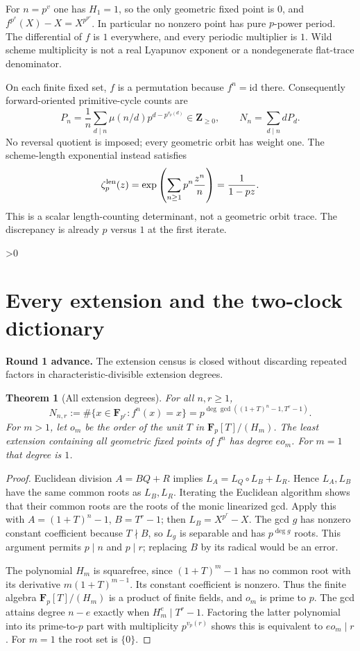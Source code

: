 \documentclass[10pt]{article}
\newtheorem{theorem}{Theorem}
\newcommand{\F}{\mathbf F}
\newcommand{\Z}{\mathbf Z}
\newcommand{\id}{\mathrm{id}}
\begin{document}
For $n=p^v$ one has $H_1=1$, so the only geometric fixed point is $0$,
and $f^{p^v}(X)-X=X^{p^{p^v}}$. In particular no nonzero point has pure
$p$-power period. The differential of $f$ is $1$ everywhere, and every
periodic multiplier is $1$. Wild scheme multiplicity is not a real
Lyapunov exponent or a nondegenerate flat-trace denominator.

On each finite fixed set, $f$ is a permutation because $f^n=\id$ there.
Consequently forward-oriented primitive-cycle counts are
\begin{equation}
 P_n=\frac1n\sum_{d\mid n}\mu(n/d)p^{d-p^{v_p(d)}}\in\Z_{\ge0},
 \qquad N_n=\sum_{d\mid n}dP_d.\label{eq:primitive}
\end{equation}
No reversal quotient is imposed; every geometric orbit has weight one.
The scheme-length exponential instead satisfies
\begin{equation}
 \zeta_p^{\rm len}(z)=\exp\left(\sum_{n\ge1}p^n\frac{z^n}{n}\right)
 =\frac1{1-pz}.\label{eq:length}
\end{equation}
This is a scalar length-counting determinant, not a geometric orbit trace.
The discrepancy is already $p$ versus $1$ at the first iterate.

\ifnum\CRevisionRound>0
\section{Every extension and the two-clock dictionary}
\noindent\textbf{Round 1 advance.} The extension census is closed without
discarding repeated factors in characteristic-divisible extension degrees.

\begin{theorem}[All extension degrees]
For all $n,r\ge1$,
\[
 N_{n,r}:=\#\{x\in\F_{p^r}:f^n(x)=x\}
 =p^{\deg\gcd((1+T)^n-1,T^r-1)}.
\]
For $m>1$, let $o_m$ be the order of the unit $T$ in
$\F_p[T]/(H_m)$. The least extension containing all geometric fixed
points of $f^n$ has degree $eo_m$. For $m=1$ that degree is $1$.
\end{theorem}
\begin{proof}
Euclidean division $A=BQ+R$ implies
$L_A=L_Q\circ L_B+L_R$. Hence $L_A,L_B$ have the same common roots
as $L_B,L_R$. Iterating the Euclidean algorithm shows that their common
roots are the roots of the monic linearized gcd. Apply this with
$A=(1+T)^n-1$, $B=T^r-1$; then $L_B=X^{p^r}-X$.
The gcd $g$ has nonzero constant coefficient because $T\nmid B$,
so $L_g$ is separable and has $p^{\deg g}$ roots. This argument permits
$p\mid n$ and $p\mid r$; replacing $B$ by its radical would be an error.

The polynomial $H_m$ is squarefree, since $(1+T)^m-1$ has no common
root with its derivative $m(1+T)^{m-1}$. Its constant coefficient is
nonzero. Thus the finite algebra $\F_p[T]/(H_m)$ is a product of finite
fields, and $o_m$ is prime to $p$. The gcd attains degree $n-e$ exactly
when $H_m^e\mid T^r-1$. Factoring the latter polynomial into its
prime-to-$p$ part with multiplicity $p^{v_p(r)}$ shows this is equivalent
to $eo_m\mid r$. For $m=1$ the root set is $\{0\}$.
\end{proof}
\end{document}

